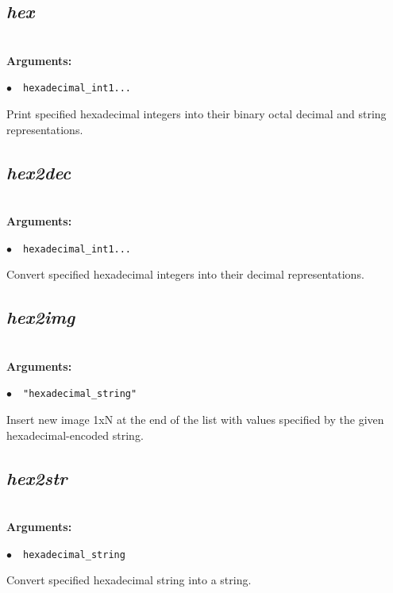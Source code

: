 \documentclass[a4paper,10.5pt,twoside]{book}
\def\comma{\discretionary{,}{}{,}}
\newcommand{\Cb}[1]{\textcolor{cb}{#1}}
\begin{document}
\subsection{\emph{hex} }\vspace*{-0.7em}
~\\\textbf{\Cb{Arguments: }}\begin{flushleft}
{\small \Cb{\hspace*{0.5cm}$\bullet$~~\texttt{hexadecimal\_int1{\comma}...}}}\end{flushleft}
Print specified hexadecimal integers into their binary{\comma} octal{\comma} decimal and string representations.


\subsection{\emph{hex2dec} }\vspace*{-0.7em}
~\\\textbf{\Cb{Arguments: }}\begin{flushleft}
{\small \Cb{\hspace*{0.5cm}$\bullet$~~\texttt{hexadecimal\_int1{\comma}...}}}\end{flushleft}
Convert specified hexadecimal integers into their decimal representations.


\subsection{\emph{hex2img} }\vspace*{-0.7em}
~\\\textbf{\Cb{Arguments: }}\begin{flushleft}
{\small \Cb{\hspace*{0.5cm}$\bullet$~~\texttt{"hexadecimal\_string"}}}\end{flushleft}
Insert new image 1xN at the end of the list with values specified by the given hexadecimal-encoded string.


\subsection{\emph{hex2str} }\vspace*{-0.7em}
~\\\textbf{\Cb{Arguments: }}\begin{flushleft}
{\small \Cb{\hspace*{0.5cm}$\bullet$~~\texttt{hexadecimal\_string}}}\end{flushleft}
Convert specified hexadecimal string into a string.
\end{document}

